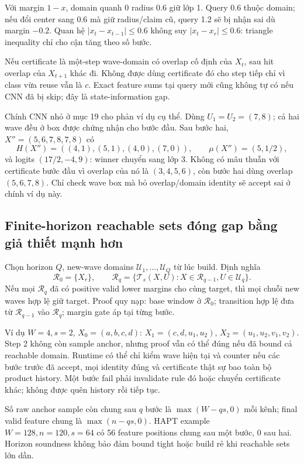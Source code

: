 \documentclass[11pt,a4paper]{article}
\newcommand{\Uset}{\mathcal U}
\theoremstyle{definition}
\begin{document}
Với margin $1-x$, domain quanh 0 radius 0.6 giữ lớp 1. Query 0.6 thuộc
domain; nếu đổi center sang 0.6 mà giữ radius/claim cũ, query 1.2 sẽ bị
nhận sai dù margin $-0.2$. Quan hệ $|x_t-x_{t-1}|\le0.6$ không suy
$|x_t-x_r|\le0.6$: triangle inequality chỉ cho cận tăng theo số bước.

Nếu certificate là một-step wave-domain có overlap cố định của $X_t$,
sau hit overlap của $X_{t+1}$ khác đi. Không được dùng certificate đó cho
step tiếp chỉ vì class vừa reuse vẫn là $c$. Exact feature sums tại query
mới cũng không tự có nếu CNN đã bị skip; đây là state-information gap.

Chính CNN nhỏ ở mục 19 cho phản ví dụ cụ thể. Dùng $U_1=U_2=(7,8)$;
cả hai wave đều ở box được chứng nhận cho bước đầu. Sau bước hai,
$X''=(5,6,7,8,7,8)$ có
\begin{equation}
H(X'')=((4,1),(5,1),(4,0),(7,0)),\qquad\mu(X'')=(5,1/2),
\end{equation}
và logits $(17/2,-4,9)$: winner chuyển sang lớp 3. Không có mâu thuẫn
với certificate bước đầu vì overlap của nó là $(3,4,5,6)$, còn bước hai
dùng overlap $(5,6,7,8)$. Chỉ check wave box mà bỏ overlap/domain identity
sẽ accept sai ở chính ví dụ này.

\subsection{Finite-horizon reachable sets đóng gap bằng giả thiết mạnh hơn}
Chọn horizon $Q$, new-wave domains $\Uset_1,\ldots,\Uset_Q$ từ lúc build.
Định nghĩa
\begin{equation}
\mathcal R_0=\{X_r\},\qquad
\mathcal R_q=\{\mathcal T_s(X,U):X\in\mathcal R_{q-1},U\in\Uset_q\}.
\end{equation}
Nếu mọi $\mathcal R_q$ đã có positive valid lower margins cho cùng target,
thì mọi chuỗi new waves hợp lệ giữ target. Proof quy nạp: base window ở
$\mathcal R_0$; transition hợp lệ đưa từ $\mathcal R_{q-1}$ vào
$\mathcal R_q$; margin gate áp tại từng bước.

Ví dụ $W=4,s=2$, $X_0=(a,b,c,d)$:
$X_1=(c,d,u_1,u_2)$, $X_2=(u_1,u_2,v_1,v_2)$. Step 2 không còn sample
anchor, nhưng proof vẫn có thể đúng nếu đã bound cả reachable domain.
Runtime có thể chỉ kiểm wave hiện tại và counter nếu các bước trước đã
accept, mọi identity đúng và certificate thật sự bao toàn bộ product
history. Một bước fail phải invalidate rule đó hoặc chuyển certificate
khác; không được quên history rồi tiếp tục.

Số raw anchor sample còn chung sau $q$ bước là
$\max(W-qs,0)$ mỗi kênh; final valid feature chung là
$\max(n-qs,0)$. HAPT example $W=128,n=120,s=64$ có 56 feature positions
chung sau một bước, 0 sau hai. Horizon soundness không bảo đảm bound tight
hoặc build rẻ khi reachable sets lớn dần.
\end{document}
